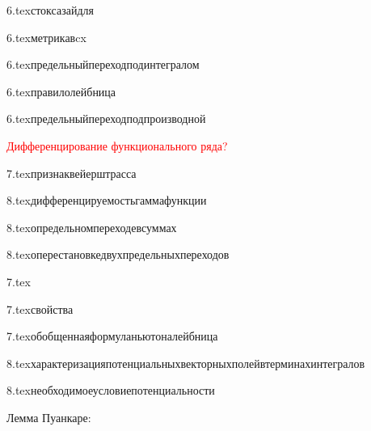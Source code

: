 {6.tex}{стоксазайдля}

{6.tex}{метрикавcx}

{6.tex}{предельныйпереходподинтегралом}

{6.tex}{правилолейбница}

{6.tex}{предельныйпереходподпроизводной}

\textcolor{red}{Дифференцирование функционального ряда?}

{7.tex}{признаквейерштрасса}

{8.tex}{дифференцируемостьгаммафункции}

{8.tex}{определьномпереходевсуммах}

{8.tex}{оперестановкедвухпредельныхпереходов}

{7.tex}{}

{7.tex}{свойства}

{7.tex}{обобщеннаяформуланьютоналейбница}

{8.tex}{характеризацияпотенциальныхвекторныхполейвтерминахинтегралов}

{8.tex}{необходимоеусловиепотенциальности}

Лемма Пуанкаре:


